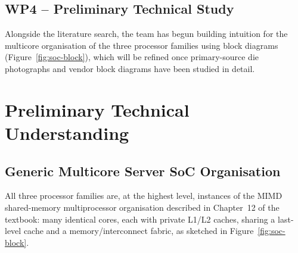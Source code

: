 \documentclass[11pt,a4paper]{article}
\begin{document}
\subsection{WP4 -- Preliminary Technical Study}
Alongside the literature search, the team has begun building intuition for the multicore
organisation of the three processor families using block diagrams (Figure~\ref{fig:soc-block}),
which will be refined once primary-source die photographs and vendor block diagrams have been
studied in detail.

\section{Preliminary Technical Understanding}

\subsection{Generic Multicore Server SoC Organisation}
All three processor families are, at the highest level, instances of the MIMD
shared-memory multiprocessor organisation described in Chapter~12 of the textbook: many
identical cores, each with private L1/L2 caches, sharing a last-level cache and a
memory/interconnect fabric, as sketched in Figure~\ref{fig:soc-block}.
\end{document}
